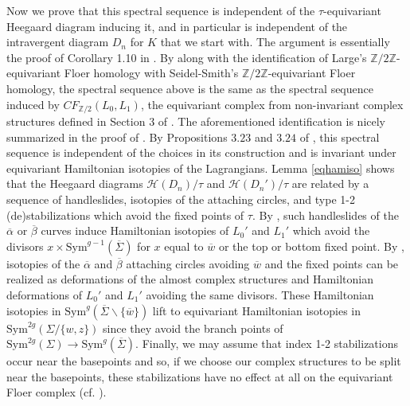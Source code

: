 \documentclass[11pt]{amsart}
\theoremstyle{definition}
\theoremstyle{remark}
\def\Z{\mathbb{Z}}
\def\Sym{\mathrm{Sym}}
\numberwithin{equation}{section}
\begin{document}
Now we prove that this spectral sequence is independent of the $\tau$-equivariant Heegaard diagram inducing it, and in particular is independent of the intravergent diagram $D_n$ for $K$ that we start with. The argument is essentially the proof of Corollary 1.10 in \cite{Hendricks_2016}.  By \cite[~Proposition 4.3]{Hendricks_2016} along with the identification of Large's $\Z/2\Z$-equivariant Floer homology with Seidel-Smith's $\Z/2\Z$-equivariant Floer homology, the spectral sequence above is the same as the spectral sequence induced by $CF_{\Z/2}(L_0, L_1)$, the equivariant complex from non-invariant complex structures defined in Section 3 of \cite{Hendricks_2016}. The aforementioned identification is nicely summarized in the proof of \cite[~Theorem 2.4]{hendricks2022rank}. By Propositions $3.23$ and $3.24$ of \cite{Hendricks_2016}, this spectral sequence is independent of the choices in its construction and is invariant under equivariant Hamiltonian isotopies of the Lagrangians. Lemma \ref{eqhamiso} shows that the Heegaard diagrams $\mathcal{H}(D_n)/\tau$ and $\mathcal{H}(D_n')/\tau$ are related by a sequence of handleslides, isotopies of the attaching circles, and type 1-2 (de)stabilizations which avoid the fixed points of $\tau$. By \cite[~Lemma 5.1]{Hendricks_2016}, such handleslides of the $\overline{\alpha}$ or $\overline{\beta}$ curves induce Hamiltonian isotopies of $L_0'$ and $L_1'$ which avoid the divisors $x\times \Sym^{g-1}(\overline{\Sigma})$ for $x$ equal to $\overline{w}$ or the top or bottom fixed point. By \cite[~Section 7.3]{OS3manifolds1}, isotopies of the $\overline{\alpha}$ and $\overline{\beta}$ attaching circles avoiding $\overline{w}$ and the fixed points can be realized as deformations of the almost complex structures and Hamiltonian deformations of $L_0'$ and $L_1'$ avoiding the same divisors. These Hamiltonian isotopies in $\Sym^g(\overline{\Sigma}\backslash\{{\overline{w}\}})$ lift to equivariant Hamiltonian isotopies in $\Sym^{2g}(\Sigma/\{w,z\})$ since they avoid the branch points of $\Sym^{2g}(\Sigma)\to \Sym^g(\overline{\Sigma})$. Finally, we may assume that index 1-2 stabilizations occur near the basepoints and so, if we choose our complex structures to be split near the basepoints, these stabilizations have no effect at all on the equivariant Floer complex (cf. \cite[~Proof of Theorem 10.1]{OS3manifolds1}).
\end{document}
